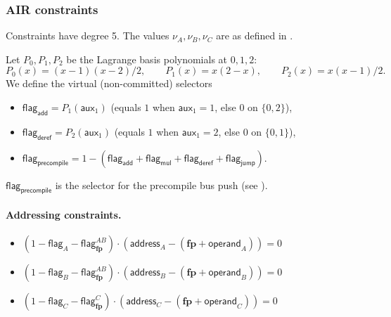 \documentclass{article}
\theoremstyle{definition}
\begin{document}
\subsubsection{AIR constraints}\label{sec:air-eval-after}

Constraints have degree 5. The values $\nu_A, \nu_B, \nu_C$ are as defined in .


Let $P_0, P_1, P_2$ be the Lagrange basis polynomials at $0, 1, 2$:
$$P_0(x) = (x-1)(x-2)/2, \qquad P_1(x) = x(2-x), \qquad P_2(x) = x(x-1)/2.$$
We define the virtual (non-committed) selectors
\begin{itemize}
    \item $\textsf{flag}_\textsf{add} = P_1(\textsf{aux}_1)$ \quad (equals $1$ when $\textsf{aux}_1 = 1$, else $0$ on $\{0, 2\}$),
    \item $\textsf{flag}_\textsf{deref} = P_2(\textsf{aux}_1)$ \quad (equals $1$ when $\textsf{aux}_1 = 2$, else $0$ on $\{0, 1\}$),
    \item $\textsf{flag}_\textsf{precompile} = 1 - (\textsf{flag}_\textsf{add} + \textsf{flag}_\textsf{mul} + \textsf{flag}_\textsf{deref} + \textsf{flag}_\textsf{jump})$.
\end{itemize}
$\textsf{flag}_\textsf{precompile}$ is the selector for the precompile bus push (see ).

\paragraph{Addressing constraints.}
\begin{itemize}
    \item $(1 - \textsf{flag}_A - \textsf{flag}^{AB}_\textbf{fp}) \cdot (\textsf{address}_A - (\textbf{fp} + \textsf{operand}_A)) = 0$
    \item $(1 - \textsf{flag}_B - \textsf{flag}^{AB}_\textbf{fp}) \cdot (\textsf{address}_B - (\textbf{fp} + \textsf{operand}_B)) = 0$
    \item $(1 - \textsf{flag}_C - \textsf{flag}^{C}_\textbf{fp}) \cdot (\textsf{address}_C - (\textbf{fp} + \textsf{operand}_C)) = 0$
\end{itemize}
\end{document}

